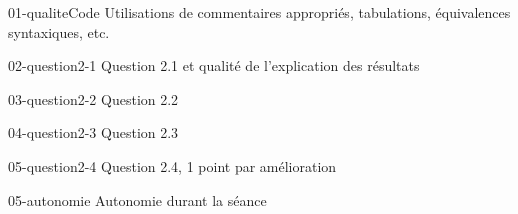 {
    \begin{question}{01-qualiteCode}
        Utilisations de commentaires appropriés, tabulations, équivalences syntaxiques, etc.
    \end{question}

    \begin{question}{02-question2-1}
        Question 2.1 et qualité de l'explication des résultats
    \end{question}

    \begin{question}{03-question2-2}
        Question 2.2
    \end{question}

    \begin{question}{04-question2-3}
        Question 2.3
    \end{question}

    \begin{question}{05-question2-4}
        Question 2.4, 1 point par amélioration
    \end{question}

    \begin{question}{05-autonomie}
        Autonomie durant la séance
    \end{question}

}



